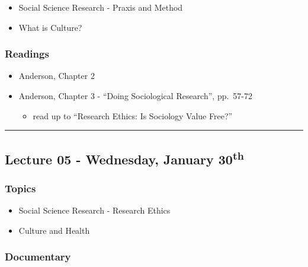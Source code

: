 \documentclass[]{book}
\providecommand{\tightlist}{%
  \setlength{\itemsep}{0pt}\setlength{\parskip}{0pt}}
\begin{document}
\begin{itemize}
\tightlist
\item
  Social Science Research - Praxis and Method
\item
  What is Culture?
\end{itemize}

\hypertarget{readings-4}{%
\subsubsection*{Readings}\label{readings-4}}

\begin{itemize}
\tightlist
\item
  Anderson, Chapter 2
\item
  Anderson, Chapter 3 - ``Doing Sociological Research'', pp.~57-72

  \begin{itemize}
  \tightlist
  \item
    read up to ``Research Ethics: Is Sociology Value Free?''
  \end{itemize}
\end{itemize}

\begin{center}\rule{0.5\linewidth}{\linethickness}\end{center}

\hypertarget{lecture-05---wednesday-january-30th}{%
\subsection*{\texorpdfstring{Lecture 05 - Wednesday, January 30\textsuperscript{th}}{Lecture 05 - Wednesday, January 30th}}\label{lecture-05---wednesday-january-30th}}

\hypertarget{topics-5}{%
\subsubsection*{Topics}\label{topics-5}}

\begin{itemize}
\tightlist
\item
  Social Science Research - Research Ethics
\item
  Culture and Health
\end{itemize}

\hypertarget{documentary-1}{%
\subsubsection*{Documentary}\label{documentary-1}}
\end{document}
